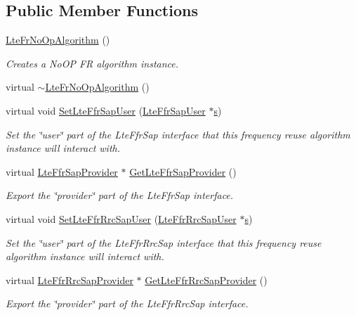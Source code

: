 \subsection*{Public Member Functions}
\begin{DoxyCompactItemize}
\item 
\hyperlink{classns3_1_1LteFrNoOpAlgorithm_ae98c7f302bd66fdc1f6eccf8db24934c}{Lte\+Fr\+No\+Op\+Algorithm} ()
\begin{DoxyCompactList}\small\item\em Creates a No\+OP FR algorithm instance. \end{DoxyCompactList}\item 
virtual \hyperlink{classns3_1_1LteFrNoOpAlgorithm_a4013b8c2466a44a93d721651d7fa3e1b}{$\sim$\+Lte\+Fr\+No\+Op\+Algorithm} ()
\item 
virtual void \hyperlink{classns3_1_1LteFrNoOpAlgorithm_a83e0a3b2e9b7488a50e2ff14735d7608}{Set\+Lte\+Ffr\+Sap\+User} (\hyperlink{classns3_1_1LteFfrSapUser}{Lte\+Ffr\+Sap\+User} $\ast$\hyperlink{generate__test__data__lte__sinr_8m_ad83eeb3a142285d1243a08c6b7026df8}{s})
\begin{DoxyCompactList}\small\item\em Set the \char`\"{}user\char`\"{} part of the Lte\+Ffr\+Sap interface that this frequency reuse algorithm instance will interact with. \end{DoxyCompactList}\item 
virtual \hyperlink{classns3_1_1LteFfrSapProvider}{Lte\+Ffr\+Sap\+Provider} $\ast$ \hyperlink{classns3_1_1LteFrNoOpAlgorithm_adc212d84e17112e7adaf825612a3c838}{Get\+Lte\+Ffr\+Sap\+Provider} ()
\begin{DoxyCompactList}\small\item\em Export the \char`\"{}provider\char`\"{} part of the Lte\+Ffr\+Sap interface. \end{DoxyCompactList}\item 
virtual void \hyperlink{classns3_1_1LteFrNoOpAlgorithm_a4522672d4dcc736b5463d7c85354d589}{Set\+Lte\+Ffr\+Rrc\+Sap\+User} (\hyperlink{classns3_1_1LteFfrRrcSapUser}{Lte\+Ffr\+Rrc\+Sap\+User} $\ast$\hyperlink{generate__test__data__lte__sinr_8m_ad83eeb3a142285d1243a08c6b7026df8}{s})
\begin{DoxyCompactList}\small\item\em Set the \char`\"{}user\char`\"{} part of the Lte\+Ffr\+Rrc\+Sap interface that this frequency reuse algorithm instance will interact with. \end{DoxyCompactList}\item 
virtual \hyperlink{classns3_1_1LteFfrRrcSapProvider}{Lte\+Ffr\+Rrc\+Sap\+Provider} $\ast$ \hyperlink{classns3_1_1LteFrNoOpAlgorithm_a9d188959445f0a95b5f351fcd7c228fe}{Get\+Lte\+Ffr\+Rrc\+Sap\+Provider} ()
\begin{DoxyCompactList}\small\item\em Export the \char`\"{}provider\char`\"{} part of the Lte\+Ffr\+Rrc\+Sap interface. \end{DoxyCompactList}\end{DoxyCompactItemize}

